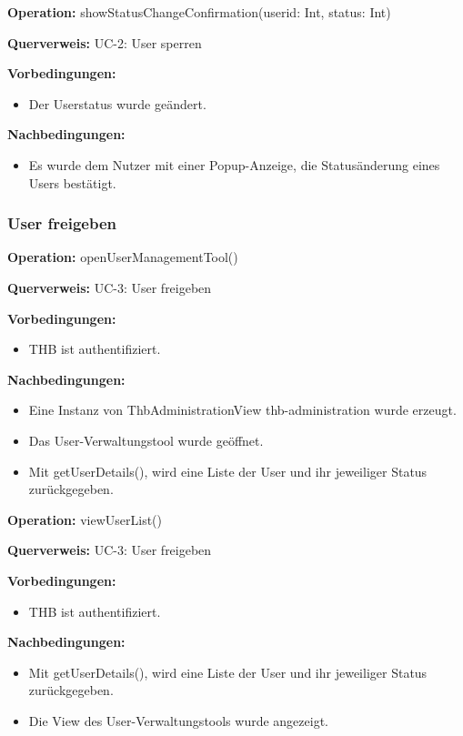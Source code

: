 \documentclass[a4paper,12pt]{article}
\begin{document}
	\begin{contractbox}
		\textbf{Operation:} showStatusChangeConfirmation(userid: Int, status: Int)
		
			\textbf{Querverweis:} UC-2: User sperren
		
		\textbf{Vorbedingungen:}
		\begin{itemize}[noitemsep]
			\item Der Userstatus wurde geändert.
		\end{itemize}
		
		\textbf{Nachbedingungen:}
		\begin{itemize}[noitemsep]
			\item Es wurde dem Nutzer mit einer Popup-Anzeige, die Statusänderung eines Users bestätigt.
		\end{itemize}
	\end{contractbox}
	
	\subsubsection{User freigeben}
	\begin{contractbox}
		\textbf{Operation:} openUserManagementTool()
		
			\textbf{Querverweis:} UC-3: User freigeben
		
		\textbf{Vorbedingungen:}
		\begin{itemize}[noitemsep]
			\item THB ist authentifiziert.
		\end{itemize}
		
		\textbf{Nachbedingungen:}
		\begin{itemize}[noitemsep]
			\item Eine Instanz von ThbAdministrationView thb-administration wurde erzeugt.
			\item Das User-Verwaltungstool wurde geöffnet.
			\item Mit getUserDetails(), wird eine Liste der User und ihr jeweiliger Status zurückgegeben.
		\end{itemize}
	\end{contractbox}

	\begin{contractbox}
		\textbf{Operation:} viewUserList()
		
			\textbf{Querverweis:} UC-3: User freigeben
		
		\textbf{Vorbedingungen:}
		\begin{itemize}[noitemsep]
			\item THB ist authentifiziert.
		\end{itemize}
		
		\textbf{Nachbedingungen:}
		\begin{itemize}[noitemsep]
			\item Mit getUserDetails(), wird eine Liste der User und ihr jeweiliger Status zurückgegeben.
			\item Die View des User-Verwaltungstools wurde angezeigt.
		\end{itemize}
	\end{contractbox}
	
\end{document}
